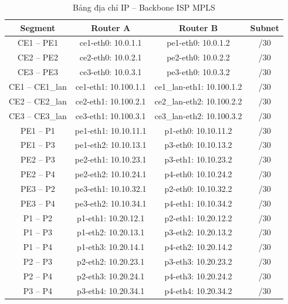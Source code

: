 \begin{table}[H]
    \centering
    \caption{Bảng địa chỉ IP -- Backbone ISP MPLS}
    \vspace{0.3cm}
    \small
    \begin{tabularx}{\textwidth}{|c|c|c|c|}
        \hline
        \textbf{Segment} & \textbf{Router A} & \textbf{Router B} & \textbf{Subnet} \\ \hline
        CE1 -- PE1 & ce1-eth0: 10.0.1.1 & pe1-eth0: 10.0.1.2 & /30 \\ \hline
        CE2 -- PE2 & ce2-eth0: 10.0.2.1 & pe2-eth0: 10.0.2.2 & /30 \\ \hline
        CE3 -- PE3 & ce3-eth0: 10.0.3.1 & pe3-eth0: 10.0.3.2 & /30 \\ \hline
        CE1 -- CE1\_lan & ce1-eth1: 10.100.1.1 & ce1\_lan-eth1: 10.100.1.2 & /30 \\ \hline
        CE2 -- CE2\_lan & ce2-eth1: 10.100.2.1 & ce2\_lan-eth2: 10.100.2.2 & /30 \\ \hline
        CE3 -- CE3\_lan & ce3-eth1: 10.100.3.1 & ce3\_lan-eth2: 10.100.3.2 & /30 \\ \hline
        PE1 -- P1 & pe1-eth1: 10.10.11.1 & p1-eth0: 10.10.11.2 & /30 \\ \hline
        PE1 -- P3 & pe1-eth2: 10.10.13.1 & p3-eth0: 10.10.13.2 & /30 \\ \hline
        PE2 -- P3 & pe2-eth1: 10.10.23.1 & p3-eth1: 10.10.23.2 & /30 \\ \hline
        PE2 -- P4 & pe2-eth2: 10.10.24.1 & p4-eth0: 10.10.24.2 & /30 \\ \hline
        PE3 -- P2 & pe3-eth1: 10.10.32.1 & p2-eth0: 10.10.32.2 & /30 \\ \hline
        PE3 -- P4 & pe3-eth2: 10.10.34.1 & p4-eth1: 10.10.34.2 & /30 \\ \hline
        P1 -- P2 & p1-eth1: 10.20.12.1 & p2-eth1: 10.20.12.2 & /30 \\ \hline
        P1 -- P3 & p1-eth2: 10.20.13.1 & p3-eth2: 10.20.13.2 & /30 \\ \hline
        P1 -- P4 & p1-eth3: 10.20.14.1 & p4-eth2: 10.20.14.2 & /30 \\ \hline
        P2 -- P3 & p2-eth2: 10.20.23.1 & p3-eth3: 10.20.23.2 & /30 \\ \hline
        P2 -- P4 & p2-eth3: 10.20.24.1 & p4-eth3: 10.20.24.2 & /30 \\ \hline
        P3 -- P4 & p3-eth4: 10.20.34.1 & p4-eth4: 10.20.34.2 & /30 \\ \hline
    \end{tabularx}
    \label{tab:ip_backbone}
\end{table}
